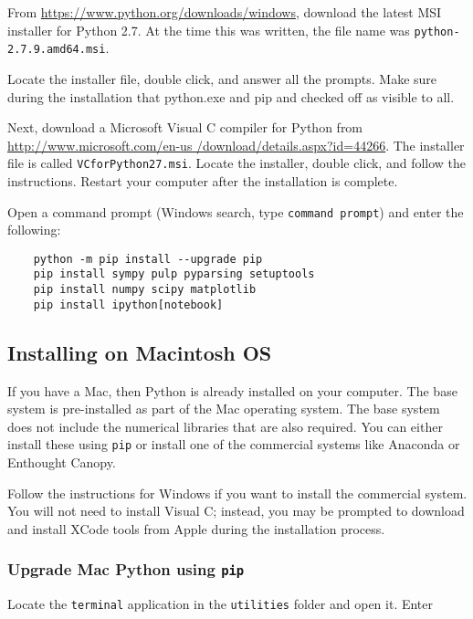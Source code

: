 From \href{https://www.python.org/downloads/windows}{https://www.python.org/downloads/windows}, download the latest MSI installer for Python 2.7. At the time this was written, the file name was {\tt python-2.7.9.amd64.msi}. 

Locate the installer file, double click, and answer all the prompts. Make sure during the installation that python.exe and pip and checked off as visible to all. 

Next, download a Microsoft Visual C compiler for Python from \href{http://www.microsoft.com/en-us/download/details.aspx?id=44266}{http://www.microsoft.com/en-us /download/details.aspx?id=44266}. The installer file is called {\tt VCforPython27.msi}. Locate the installer, double click, and follow the instructions. Restart your computer after the installation is complete.

Open a command prompt (Windows search, type {\tt command prompt}) and enter the following:

\begin{lstlisting}
    python -m pip install --upgrade pip   
    pip install sympy pulp pyparsing setuptools
    pip install numpy scipy matplotlib
    pip install ipython[notebook]
\end{lstlisting}


\subsection{Installing on Macintosh OS}

If you have a Mac, then Python is already installed on your computer. The base system is pre-installed as part of the Mac operating system. The base system does not include the numerical libraries that are also required. You can either install these using {\tt pip} or install one of the commercial systems like Anaconda or Enthought Canopy. 

Follow the instructions for Windows if you want to install the commercial system. You will not need to install Visual C; instead, you may be prompted to download and install XCode tools from Apple during the installation process.  

\subsubsection{Upgrade Mac Python using \tt pip}

Locate the {\tt terminal} application in the {\tt utilities} folder and open it. Enter

